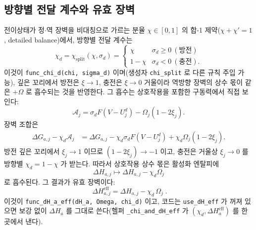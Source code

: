 \documentclass[11pt,a4paper]{article}
\newcommand{\eff}{\mathrm{eff}}
\newcommand{\code}[1]{\texttt{#1}}
\begin{document}
\subsection{방향별 전달 계수와 유효 장벽}
전이상태가 정$\cdot$역 장벽을 비대칭으로 가르는 분율 $\chi\in[0,1]$ 의 합-1 제약($\chi+\chi'=1$, detailed balance)에서,
방향별 전달 계수는
\begin{equation}
\chi_d=\chi_\mathrm{split}(\chi,\sigma_d)=
\begin{cases}\chi & \sigma_d\ge0\ (\text{방전})\\ 1-\chi & \sigma_d<0\ (\text{충전}).\end{cases}
\label{eq:chid}
\end{equation}
이것이 \code{func\_chi\_d(chi, sigma\_d)} 이며(생성자 \code{chi\_split} 로 다른 규칙 주입 가능), 깊은 꼬리에서 방전은
$\xi\to1$, 충전은 $\xi\to0$ 거울이라 역방향 장벽의 상수 몫이 같은 $+\Omega$ 로 흡수되는 것을 반영한다. 그 흡수는
상호작용을 포함한 구동력에서 직접 보인다:
\begin{equation}
\mathcal A_j=\sigma_dF(V-U_j^d)-\Omega_j(1-2\xi_j).
\label{eq:A_with_Omega_v809}
\end{equation}
장벽 조합은
\begin{align}
\Delta G_{a,j}-\chi_d\mathcal A_j
&=\Delta G_{a,j}-\chi_d\sigma_dF(V-U_j^d)
+\chi_d\Omega_j(1-2\xi_j).
\label{eq:barrier_split_v809}
\end{align}
방전 깊은 꼬리에서 $\xi_j\to1$ 이므로 $(1-2\xi_j)\to-1$ 이고, 충전은 거울상 $\xi_j\to0$ 를 방향별 $\chi_d=1-\chi$ 가 받는다.
따라서 상호작용 상수 몫은 활성화 엔탈피에
\begin{equation}
\Delta H_{a,j}\longmapsto \Delta H_{a,j}-\chi_d\Omega_j
\label{eq:dHeff_map_v809}
\end{equation}
로 흡수된다. 그 결과가 유효 장벽이다:
\begin{equation}
\boxed{\;\Delta H_{a,j}^\eff=\Delta H_{a,j}-\chi_d\,\Omega_j\;.}
\label{eq:dHeff}
\end{equation}
이것이 \code{func\_dH\_a\_eff(dH\_a, Omega, chi\_d)} 이고, 코드는 \code{use\_dH\_eff} 가 꺼져 있으면 보강 없이
$\Delta H_a$ 를 그대로 쓴다(헬퍼 \code{\_chi\_and\_dH\_eff} 가 $(\chi_d,\Delta H_a^\eff)$ 를 한 곳에서 낸다).
\end{document}
